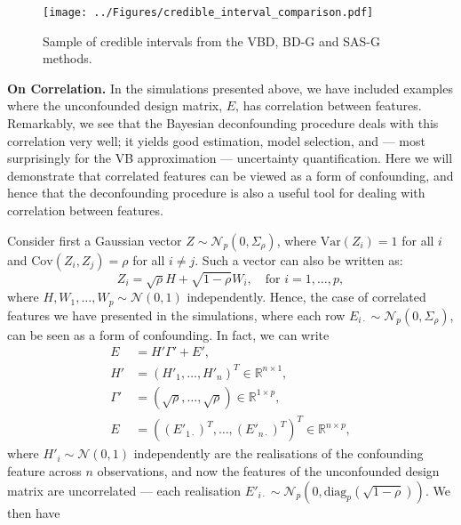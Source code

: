\documentclass[11pt]{article}
\newcommand{\subparspacenonewline}{\vspace{3mm}}
\newcommand{\R}{\mathbb{R}}
\newcommand{\N}{\mathcal{N}}
\newcommand{\diag}{\textrm{diag}}
\begin{document}
\begin{figure}[h]
\centering
  \texttt{[image: ../Figures/credible\_interval\_comparison.pdf]}
  \caption{Sample of credible intervals from the VBD, BD-G and SAS-G methods.}
  \label{fig:credible_interval_sample}
\end{figure}

\subparspacenonewline
{\bf On Correlation.}
In the simulations presented above, we have included examples where the unconfounded design matrix, $E$, has correlation between features. Remarkably, we see that the Bayesian deconfounding procedure deals with this correlation very well; it yields good estimation, model selection, and --- most surprisingly for the VB approximation --- uncertainty quantification. Here we will demonstrate that correlated features can be viewed as a form of confounding, and hence that the deconfounding procedure is also a useful tool for dealing with correlation between features. 

Consider first a Gaussian vector $Z \sim \N_p(0, \Sigma_\rho)$, where $\textrm{Var}(Z_i) = 1$ for all $i$ and $\textrm{Cov}(Z_i, Z_j) = \rho$ for all $i \neq j$. Such a vector can also be written as:
$$
Z_i = \sqrt{\rho} H + \sqrt{1-\rho} W_i, \quad \textrm{for } i = 1,\dots,p,
$$
where $H, W_1, \dots, W_p \sim \N(0, 1)$ independently. Hence, the case of correlated features we have presented in the simulations, where each row $E_{i\cdot} \sim \N_p(0, \Sigma_\rho)$, can be seen as a form of confounding. In fact, we can write
\begin{align*}
E &= H'\Gamma' + E', \\
H' &= (H'_1, \dots, H'_n)^T \in \R^{n \times 1},\\
\Gamma' &= (\sqrt{\rho}, \dots, \sqrt{\rho})\in \R^{1 \times p},\\
E &= ((E'_{1\cdot})^T, \dots, (E'_{n\cdot})^T)^T \in \R^{n \times p},
\end{align*}
where $H'_i \sim \N(0, 1)$ independently are the realisations of the confounding feature across $n$ observations, and now the features of the unconfounded design matrix are uncorrelated --- each realisation $E'_{i\cdot} \sim \N_p(0, \diag_p(\sqrt{1-\rho}))$. We then have
\end{document}
